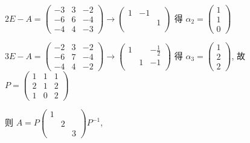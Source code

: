          \( 2E-A = \begin{pmatrix}
             -3 & 3 & -2 \\
             -6 & 6 & -4 \\
             -4 & 4 & -3
         \end{pmatrix} \rightarrow \begin{pmatrix}
             1 & -1 &   \\
               &    & 1 \\
               &    &
         \end{pmatrix} \) 得 \( \alpha_{2} = \begin{pmatrix}
             1 \\
             1 \\
             0
         \end{pmatrix} \)

         \( 3E-A = \begin{pmatrix}
             -2 & 3 & -2 \\
             -6 & 7 & -4 \\
             -4 & 4 & -2
         \end{pmatrix} \rightarrow \begin{pmatrix}
             1 &   & -\frac{1}{2} \\
               & 1 & -1           \\
               &   &
         \end{pmatrix} \) 得 \( \alpha_{3} = \begin{pmatrix}
             1 \\
             2 \\
             2
         \end{pmatrix} \), 故 \( P = \begin{pmatrix}
             1 & 1 & 1 \\
             2 & 1 & 2 \\
             1 & 0 & 2
         \end{pmatrix} \)

         则 \( A = P\begin{pmatrix}
             1 &   &   \\
               & 2 &   \\
               &   & 3
         \end{pmatrix}P^{-1} \),

